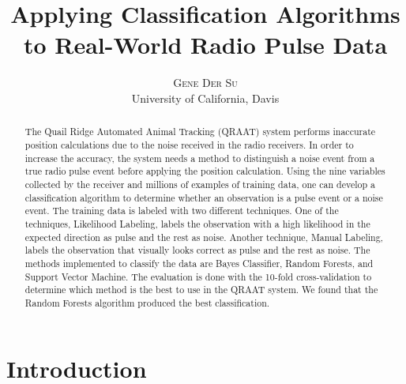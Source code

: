 \documentclass[twoside]{article}
\title{\vspace{-15mm}\fontsize{24pt}{10pt}\selectfont\textbf{Applying Classification Algorithms to Real-World Radio Pulse Data}} %
\author{
\large
\textsc{Gene Der Su}\\
\normalsize University of California, Davis \\ %
\vspace{-5mm}
}
\date{}
\begin{document}
\maketitle %

\thispagestyle{fancy} %


\begin{abstract}

\noindent The Quail Ridge Automated Animal Tracking (QRAAT) system performs inaccurate position calculations due to the noise received in the radio receivers. In order to increase the accuracy, the system needs a method to distinguish a noise event from a true radio pulse event before applying the position calculation. Using the nine variables collected by the receiver and millions of examples of training data, one can develop a classification algorithm to determine whether an observation is a pulse event or a noise event. The training data is labeled with two different techniques. One of the techniques, Likelihood Labeling, labels the observation with a high likelihood in the expected direction as pulse and the rest as noise. Another technique, Manual Labeling, labels the observation that visually looks correct as pulse and the rest as noise. The methods implemented to classify the data are Bayes Classifier, Random Forests, and Support Vector Machine. The evaluation is done with the 10-fold cross-validation to determine which method is the best to use in the QRAAT system. We found that the Random Forests algorithm produced the best classification.

\end{abstract}



\section{Introduction}
\end{document}
